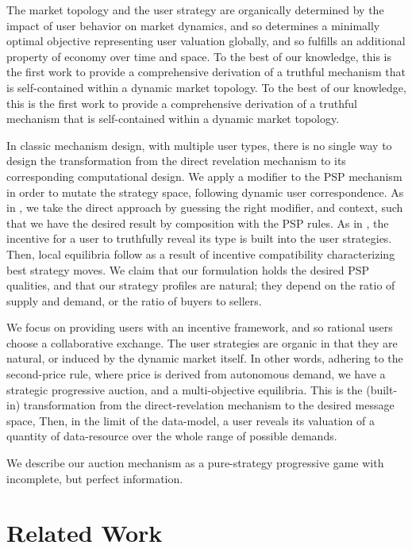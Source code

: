 The market
topology and the user strategy are organically determined by the impact of user
behavior on market dynamics, and so determines a minimally optimal objective
representing user valuation globally, and so fulfills an additional property of
economy over time and space. To the best of our knowledge, this is the first
work to provide a comprehensive derivation of a truthful mechanism that is self-contained within a dynamic market
topology.
To the best of our knowledge, this is the first work to provide a comprehensive
derivation of a truthful mechanism that is self-contained within a dynamic market
topology. 

In classic mechanism design, with multiple user types, there is no single
way to design the transformation from the direct revelation mechanism to its
corresponding computational design. We apply a modifier to the PSP mechanism in
order to mutate the strategy space, following dynamic user
correspondence. As in \cite{lazar}, we take the direct
approach by guessing the right modifier, and context, such that we have the
desired result by composition with the PSP rules. 
As in \cite{lazar}, the incentive for a
user to truthfully reveal its type is built into the user strategies. Then,
local equilibria follow as a result of incentive
compatibility characterizing best strategy moves.
We claim that our formulation holds the desired PSP qualities,
and that our strategy profiles are natural; they depend on the ratio of
supply and demand, or the ratio of buyers to sellers.

We focus on providing users with an incentive framework, and
so rational users choose a collaborative exchange. 
The user strategies are organic in that they are natural, or
induced by the dynamic market itself. In other words, adhering to the second-price rule,
where price is derived from autonomous demand, we have a strategic
progressive auction, and a multi-objective equilibria.
This is the (built-in) transformation from the
direct-revelation mechanism to the desired message space, Then, in the limit of
the data-model, a user reveals its valuation of a quantity of data-resource over the whole range of possible demands.

We describe our auction mechanism as a
pure-strategy progressive game with incomplete, but perfect information.

\section{Related Work}

